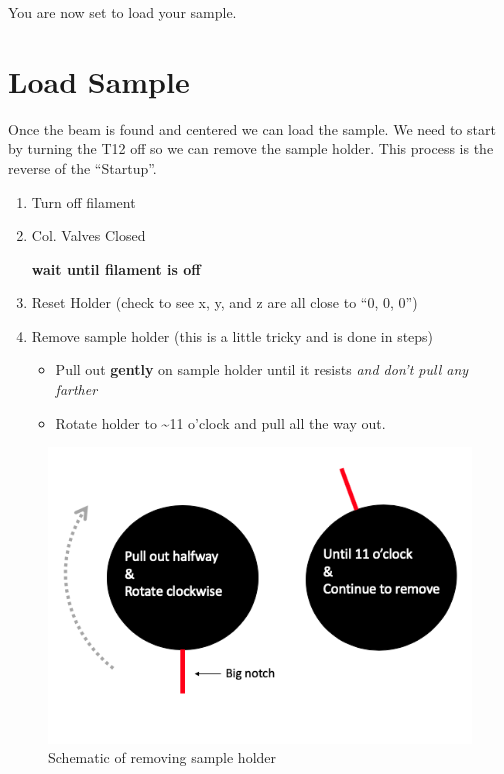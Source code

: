 \documentclass[]{book}
\providecommand{\tightlist}{%
  \setlength{\itemsep}{0pt}\setlength{\parskip}{0pt}}
\begin{document}
You are now set to load your sample.

\hypertarget{load-sample}{%
\chapter{Load Sample}\label{load-sample}}

Once the beam is found and centered we can load the sample. We need to start by turning the T12 off so we can remove the sample holder. This process is the reverse of the ``Startup''.

\begin{enumerate}
\def\labelenumi{\arabic{enumi})}
\item
  Turn off filament
\item
  Col. Valves Closed

  \textbf{wait until filament is off}
\item
  Reset Holder (check to see x, y, and z are all close to ``0, 0, 0'')
\item
  Remove sample holder (this is a little tricky and is done in steps)

  \begin{itemize}
  \tightlist
  \item
    Pull out \textbf{gently} on sample holder until it resists \emph{and don't pull any farther}
  \item
    Rotate holder to \textasciitilde{}11 o'clock and pull all the way out.
  \end{itemize}
\end{enumerate}

\begin{figure}
\includegraphics[width=7.61in]{images/remove_holder} \caption{Schematic of removing sample holder}\label{fig:unnamed-chunk-3}
\end{figure}
\end{document}
